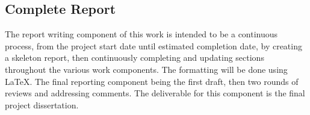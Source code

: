\subsection{Complete Report}

The report writing component of this work is intended to be a continuous process, from the project start date until estimated completion date, by creating a skeleton report, then continuously completing and updating sections throughout the various work components. 
The formatting will be done using \LaTeX.
The final reporting component being the first draft, then two rounds of reviews and addressing comments. The deliverable for this component is the final project dissertation. 
